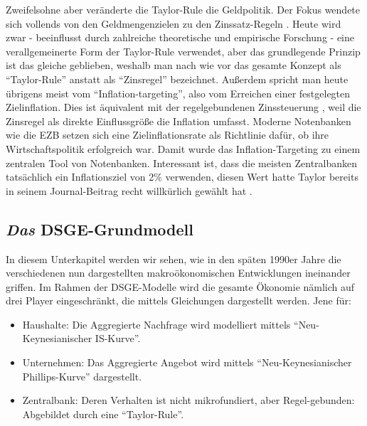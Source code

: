 Zweifelsohne aber veränderte die Taylor-Rule die Geldpolitik. Der Fokus wendete sich vollends von den Geldmengenzielen \parencite{Friedman1960} zu den Zinssatz-Regeln \parencite[S. 36]{Gali2007}. Heute wird zwar - beeinflusst durch zahlreiche theoretische \parencite{Woodford2001} und empirische \parencite{Gali2000, Taylor1999} Forschung - eine verallgemeinerte Form der Taylor-Rule verwendet, aber das grundlegende Prinzip ist das gleiche geblieben, weshalb man nach wie vor das gesamte Konzept als "`Taylor-Rule"' anstatt als "`Zinsregel"' bezeichnet. Außerdem spricht man heute übrigens meist vom "`Inflation-targeting"', also vom Erreichen einer festgelegten Zielinflation. Dies ist äquivalent mit der regelgebundenen Zinssteuerung \parencite{Taylor2006}, weil die Zinsregel als direkte Einflussgröße die Inflation umfasst. Moderne Notenbanken wie die EZB setzen sich eine Zielinflationsrate als Richtlinie dafür, ob ihre Wirtschaftspolitik erfolgreich war. Damit wurde das Inflation-Targeting zu einem zentralen Tool von Notenbanken. Interessant ist, dass die meisten Zentralbanken tatsächlich ein Inflationsziel von 2\% verwenden, diesen Wert hatte Taylor bereits in seinem Journal-Beitrag recht willkürlich gewählt hat \parencite[S. 202]{Taylor1993}. 

\subsection{\textit{Das} DSGE-Grundmodell}
\label{DSGEGrundmodell}

In diesem Unterkapitel werden wir sehen, wie in den späten 1990er Jahre die verschiedenen nun dargestellten makroökonomischen Entwicklungen ineinander griffen. Im Rahmen der DSGE-Modelle wird die gesamte Ökonomie nämlich auf drei Player eingeschränkt, die mittels Gleichungen dargestellt werden. Jene für:

\begin{itemize}
	\item Haushalte: Die Aggregierte Nachfrage wird modelliert mittels "`Neu-Keynesianischer IS-Kurve"'.
	\item Unternehmen: Das Aggregierte Angebot wird mittels "`Neu-Keynesianischer Phillips-Kurve"' dargestellt.
	\item Zentralbank: Deren Verhalten ist nicht mikrofundiert, aber Regel-gebunden: Abgebildet durch eine "`Taylor-Rule"'.
\end{itemize}

